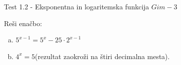 \documentclass[a4paper,12pt]{letter}
\renewcommand{\headrulewidth}{3pt}
\renewcommand{\headrulewidth}{0.3pt}
\newcounter{tocke}
\begin{document}
\pagestyle{fancy}
\renewcommand\headrulewidth{0pt}
\lhead{}\chead{}\rhead{}
\rfoot{\vspace*{-2\baselineskip}}
\renewcommand{\vec}{\overrightarrow}
\def\programletnik{Gim - 3}
\def\naslov{Test 1.2 - }
\def\sklop{Eksponentna in logaritemska funkcija}
\def\tockeA{4+3}
\def\tockeB{2+3+4+4}
\def\tockeC{4+4}
\def\tockeD{4+4}
\def\tockeE{4}
\begin{minipage}{20cm}
\begin{bclogo}[couleur=brown!30,
  arrondi=0,ombre=true, couleurOmbre=gray!50,
logo =\bcplume,
  noborder=true]
{\textrm{{\Large{\naslov \sklop} \Huge{}
\large{} \hfill $\programletnik$}}}
\end{bclogo}
\end{minipage}
\begin{minipage}{20cm}
\begin{bclogo}[couleur=brown!30,
  arrondi=0,ombre=true, couleurOmbre=gray!50,
logo =\bcplume,
  noborder=true]
{\textrm{{}}}
\end{bclogo}
\end{minipage}

\begin{naloga}[\hfill $\tockeA$] \addtocounter{tocke}{\numexpr\tockeA\relax}
Re\v{s}i ena\v{c}bo:
\begin{enumerate}[a)]
\item $5^{x-1}=5^{x}-25\cdot2^{x-1}$
\item $4^{x}=5$\quad (rezultat zaokro\v{z}i na \v{s}tiri decimalna mesta).
\end{enumerate}
\end{naloga}\newpage
\end{document}
